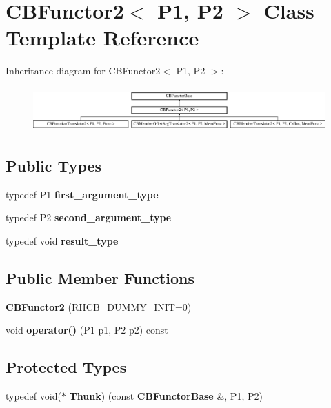 \section{C\+B\+Functor2$<$ P1, P2 $>$ Class Template Reference}
\label{classCBFunctor2}
Inheritance diagram for C\+B\+Functor2$<$ P1, P2 $>$\+:\begin{figure}[H]
\begin{center}
\leavevmode
\includegraphics[height=1.717791cm]{classCBFunctor2}
\end{center}
\end{figure}
\subsection*{Public Types}
\begin{DoxyCompactItemize}
\item 
typedef P1 {\bfseries first\+\_\+argument\+\_\+type}\label{classCBFunctor2_a0b602135cc723557db0a98baac332f64}

\item 
typedef P2 {\bfseries second\+\_\+argument\+\_\+type}\label{classCBFunctor2_a42cb017aa79a85ae6c4c0d908b40b6e4}

\item 
typedef void {\bfseries result\+\_\+type}\label{classCBFunctor2_a7043f721c3f7cc64589a88ba678ade59}

\end{DoxyCompactItemize}
\subsection*{Public Member Functions}
\begin{DoxyCompactItemize}
\item 
{\bfseries C\+B\+Functor2} (R\+H\+C\+B\+\_\+\+D\+U\+M\+M\+Y\+\_\+\+I\+N\+IT=0)\label{classCBFunctor2_ab60622cec9febd42e7916f92567bc223}

\item 
void {\bfseries operator()} (P1 p1, P2 p2) const \label{classCBFunctor2_a8ef9e7a58474f11df3e9b0db59068016}

\end{DoxyCompactItemize}
\subsection*{Protected Types}
\begin{DoxyCompactItemize}
\item 
typedef void($\ast$ {\bfseries Thunk}) (const {\bf C\+B\+Functor\+Base} \&, P1, P2)\label{classCBFunctor2_a635d8110a9fae90fb52977641b980241}

\end{DoxyCompactItemize}
